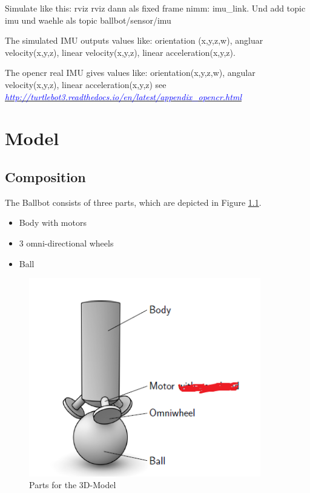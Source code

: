 \documentclass[twoside,colorback,accentcolor=tud4c,11pt]{tudreport}
\newcommand{\mylink}[2] {	\href{#1}{	\textit{\textcolor{blue}{#2}}}}
\begin{document}
	Simulate like this:
	rviz rviz dann als fixed frame nimm: imu\_link. Und add topic imu und waehle als topic ballbot/sensor/imu
	
	The simulated IMU outputs values like: orientation (x,y,z,w), angluar velocity(x,y,z), linear velocity(x,y,z), linear acceleration(x,y,z).
	
	The opencr real IMU gives values like: orientation(x,y,z,w), angular velocity(x,y,z), linear acceleration(x,y,z) see \mylink{OpenCR board IMU }{http://turtlebot3.readthedocs.io/en/latest/appendix\_opencr.html}
	
	\chapter{Model}
	
	\section{Composition}
	The Ballbot consists of three parts, which are depicted in Figure \ref{fig:Structure}.
	
	\begin{itemize}
		\item Body with motors
		\item 3 omni-directional wheels
		\item Ball
	\end{itemize}
	
	
	\begin{figure}[htbp]
		\centering
		\includegraphics[width=0.9\textwidth]{img/Strucuture.PNG}
		\caption{Parts for the 3D-Model}
		\label{fig:Structure}
	\end{figure}
	
\end{document}
